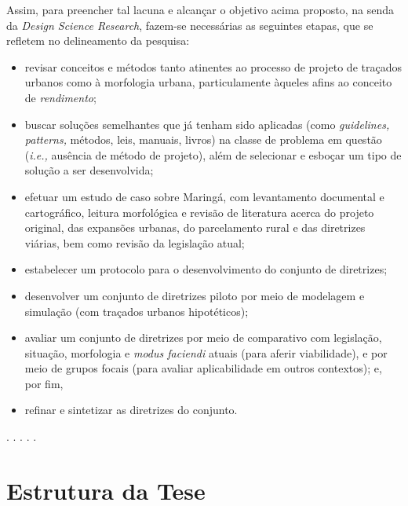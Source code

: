 \documentclass[12pt, a4paper]{book} %
\begin{document}
        Assim, para preencher tal lacuna e alcançar o objetivo acima proposto, na senda da \textit{Design Science Research}, fazem-se necessárias as seguintes etapas, que se refletem no delineamento da pesquisa: 
            \begin{itemize}
                \item revisar conceitos e métodos tanto atinentes ao processo de projeto de traçados urbanos como à morfologia urbana, particulamente àqueles afins ao conceito de \textit{rendimento}; 
                \item buscar soluções semelhantes que já tenham sido aplicadas (como \textit{guidelines, patterns,} métodos, leis, manuais, livros) na classe de problema em questão (\textit{i.e.,} ausência de método de projeto), além de selecionar e esboçar um tipo de solução a ser desenvolvida;
                \item efetuar um estudo de caso sobre Maringá, com levantamento documental e cartográfico, leitura morfológica e revisão de literatura acerca do projeto original, das expansões urbanas, do parcelamento rural e das diretrizes viárias, bem como revisão da legislação atual; %
                \item estabelecer um protocolo para o desenvolvimento do conjunto de diretrizes; 
                \item desenvolver um conjunto de diretrizes piloto por meio de modelagem e simulação (com traçados urbanos hipotéticos); 
                \item avaliar um conjunto de diretrizes por meio de comparativo com legislação, situação, morfologia e \textit{modus faciendi} atuais (para aferir viabilidade), e por meio de grupos focais (para avaliar aplicabilidade em outros contextos); e, por fim, 
                \item refinar e sintetizar as diretrizes do conjunto.
            \end{itemize}

        \begin{center}
        . . . . .
        \end{center}

            \section*{Estrutura da Tese}
\end{document}
